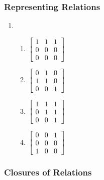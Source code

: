 \documentclass{sig-alternate-05-2015}
\begin{document}
\subsubsection{Representing Relations}
\begin{enumerate}
\item 
\begin{enumerate}
	\item 
	$\begin{bmatrix}
		1 & 1 & 1\\
		0 & 0 & 0\\
		0 & 0 & 0
	\end{bmatrix}$
	\item 
	$\begin{bmatrix}
	0 & 1 & 0\\
	1 & 1 & 0\\
	0 & 0 & 1
	\end{bmatrix}$
	\item 
	$\begin{bmatrix}
	1 & 1 & 1\\
	0 & 1 & 1\\
	0 & 0 & 1
	\end{bmatrix}$
	\item 
	$\begin{bmatrix}
	0 & 0 & 1\\
	0 & 0 & 0\\
	1 & 0 & 0
	\end{bmatrix}$
\end{enumerate}
\end{enumerate}
\subsubsection{Closures of Relations}
\end{document}
